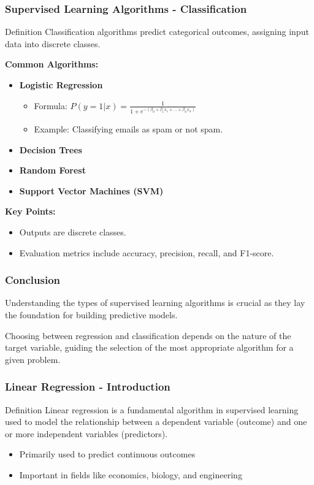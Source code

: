\documentclass{beamer}
\begin{document}
\begin{frame}[fragile]
    \frametitle{Supervised Learning Algorithms - Classification}
    \begin{block}{Definition}
        Classification algorithms predict categorical outcomes, assigning input data into discrete classes.
    \end{block}
    
    \textbf{Common Algorithms:}
    \begin{itemize}
        \item \textbf{Logistic Regression}
            \begin{itemize}
                \item Formula: \( P(y=1 | x) = \frac{1}{1 + e^{-(\beta_0 + \beta_1x_1 + ... + \beta_nx_n)}} \)
                \item Example: Classifying emails as spam or not spam.
            \end{itemize}
        \item \textbf{Decision Trees}
        \item \textbf{Random Forest}
        \item \textbf{Support Vector Machines (SVM)}
    \end{itemize}
    
    \textbf{Key Points:}
    \begin{itemize}
        \item Outputs are discrete classes.
        \item Evaluation metrics include accuracy, precision, recall, and F1-score.
    \end{itemize}
\end{frame}

\begin{frame}[fragile]
    \frametitle{Conclusion}
    Understanding the types of supervised learning algorithms is crucial as they lay the foundation for building predictive models. 

    Choosing between regression and classification depends on the nature of the target variable, guiding the selection of the most appropriate algorithm for a given problem.
\end{frame}

\begin{frame}[fragile]
    \frametitle{Linear Regression - Introduction}
    \begin{block}{Definition}
        Linear regression is a fundamental algorithm in supervised learning used to model the relationship between a dependent variable (outcome) and one or more independent variables (predictors).
    \end{block}
    
    \begin{itemize}
        \item Primarily used to predict continuous outcomes
        \item Important in fields like economics, biology, and engineering
    \end{itemize}
\end{frame}
\end{document}
